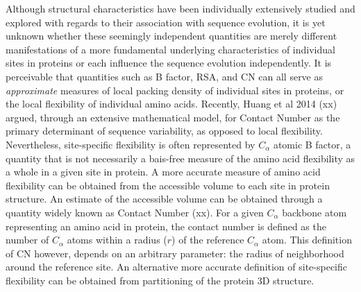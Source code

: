 \documentclass[11pt]{article}
\begin{document}
    Although structural characteristics have been individually extensively studied and explored with regards to their association with sequence evolution, it is yet unknown whether these seemingly independent quantities are merely different manifestations of a more fundamental underlying characteristics of individual sites in proteins or each influence the sequence evolution independently. It is perceivable that quantities such as B factor, RSA, and CN can all serve as {\it approximate} measures of local packing density of individual sites in proteins, or the local flexibility of individual amino acids. Recently, Huang et al 2014 (xx) argued, through an extensive mathematical model, for Contact Number as the primary determinant of sequence variability, as opposed to local flexibility. Nevertheless, site-specific flexibility is often represented by $C_\alpha$ atomic B factor, a quantity that is not necessarily a bais-free measure of the amino acid flexibility as a whole in a given site in protein. A more accurate measure of amino acid flexibility can be obtained from the accessible volume to each site in protein structure. An estimate of the accessible volume can be obtained through a quantity widely known as Contact Number (xx). For a given $C_\alpha$ backbone atom representing an amino acid in protein, the contact number is defined as the number of $C_\alpha$ atoms within a radius ($r$) of the reference $C_\alpha$ atom.  This definition of CN however, depends on an arbitrary parameter: the radius of neighborhood around the reference site.  An alternative more accurate definition of site-specific flexibility can be obtained from partitioning of the protein 3D structure. \\
    
\end{document}
